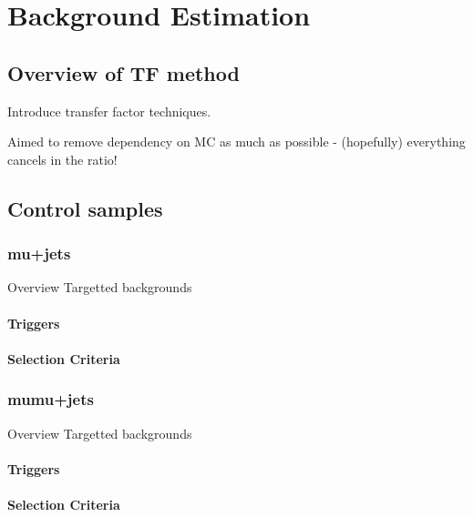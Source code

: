 \chapter{Background Estimation}
\label{ch:6}

\ifpdf
    \graphicspath{{Chapter6/Figs/Raster/}{Chapter6/Figs/PDF/}{Chapter6/Figs/}}
\else
    \graphicspath{{Chapter6/Figs/Vector/}{Chapter6/Figs/}}
\fi


\section{Overview of TF method}  %
\label{sec:background_overview}
Introduce transfer factor techniques.

Aimed to remove dependency on MC as much as possible - (hopefully) everything cancels in 
the ratio!


\section{Control samples}  %
\label{sec:background_control}

\subsection{mu+jets}
Overview
Targetted backgrounds
\subsubsection{Triggers}
\subsubsection{Selection Criteria}

\subsection{mumu+jets}
Overview
Targetted backgrounds
\subsubsection{Triggers}
\subsubsection{Selection Criteria}

